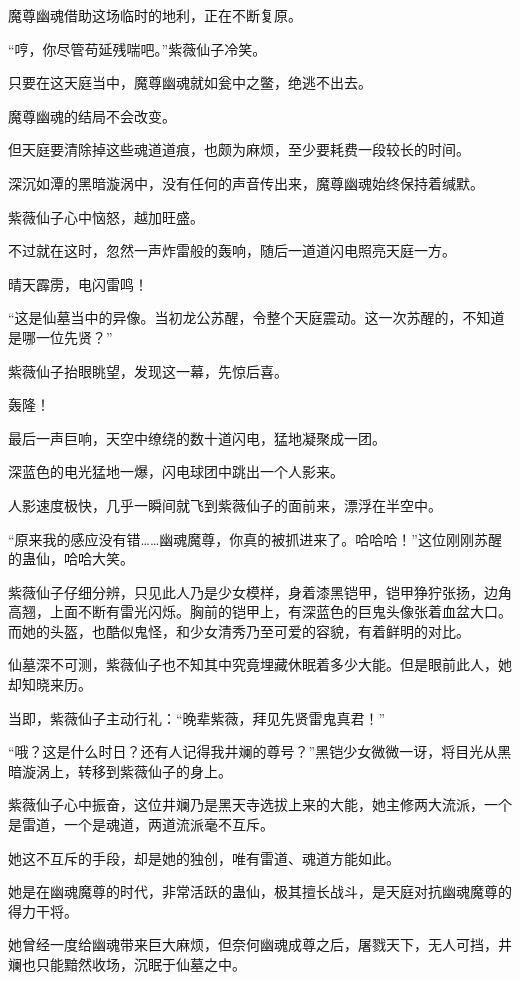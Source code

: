 \begin{this_body}
魔尊幽魂借助这场临时的地利，正在不断复原。

“哼，你尽管苟延残喘吧。”紫薇仙子冷笑。

只要在这天庭当中，魔尊幽魂就如瓮中之鳖，绝逃不出去。

魔尊幽魂的结局不会改变。

但天庭要清除掉这些魂道道痕，也颇为麻烦，至少要耗费一段较长的时间。

深沉如潭的黑暗漩涡中，没有任何的声音传出来，魔尊幽魂始终保持着缄默。

紫薇仙子心中恼怒，越加旺盛。

不过就在这时，忽然一声炸雷般的轰响，随后一道道闪电照亮天庭一方。

晴天霹雳，电闪雷鸣！

“这是仙墓当中的异像。当初龙公苏醒，令整个天庭震动。这一次苏醒的，不知道是哪一位先贤？”

紫薇仙子抬眼眺望，发现这一幕，先惊后喜。

轰隆！

最后一声巨响，天空中缭绕的数十道闪电，猛地凝聚成一团。

深蓝色的电光猛地一爆，闪电球团中跳出一个人影来。

人影速度极快，几乎一瞬间就飞到紫薇仙子的面前来，漂浮在半空中。

“原来我的感应没有错……幽魂魔尊，你真的被抓进来了。哈哈哈！”这位刚刚苏醒的蛊仙，哈哈大笑。

紫薇仙子仔细分辨，只见此人乃是少女模样，身着漆黑铠甲，铠甲狰狞张扬，边角高翘，上面不断有雷光闪烁。胸前的铠甲上，有深蓝色的巨鬼头像张着血盆大口。而她的头盔，也酷似鬼怪，和少女清秀乃至可爱的容貌，有着鲜明的对比。

仙墓深不可测，紫薇仙子也不知其中究竟埋藏休眠着多少大能。但是眼前此人，她却知晓来历。

当即，紫薇仙子主动行礼：“晚辈紫薇，拜见先贤雷鬼真君！”

“哦？这是什么时日？还有人记得我井斓的尊号？”黑铠少女微微一讶，将目光从黑暗漩涡上，转移到紫薇仙子的身上。

紫薇仙子心中振奋，这位井斓乃是黑天寺选拔上来的大能，她主修两大流派，一个是雷道，一个是魂道，两道流派毫不互斥。

她这不互斥的手段，却是她的独创，唯有雷道、魂道方能如此。

她是在幽魂魔尊的时代，非常活跃的蛊仙，极其擅长战斗，是天庭对抗幽魂魔尊的得力干将。

她曾经一度给幽魂带来巨大麻烦，但奈何幽魂成尊之后，屠戮天下，无人可挡，井斓也只能黯然收场，沉眠于仙墓之中。


\end{this_body}
